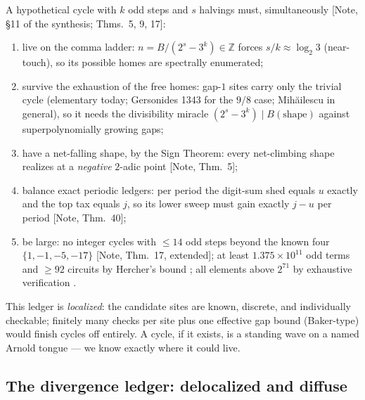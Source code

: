 \documentclass[11pt]{article}
\theoremstyle{definition}
\theoremstyle{remark}
\newcommand{\anchor}[1]{\textup{[#1]}}
\newcommand{\Z}{\mathbb{Z}}
\begin{document}
A hypothetical cycle with $k$ odd steps and $s$ halvings must, simultaneously
\anchor{Note, \S11 of the synthesis; Thms.~5, 9, 17}:
\begin{enumerate}[leftmargin=2em, itemsep=1pt]
\item live on the comma ladder: $n = B/(2^s-3^k) \in \Z$ forces
$s/k \approx \log_2 3$ (near-touch), so its possible homes are spectrally
enumerated;
\item survive the exhaustion of the free homes: gap-$1$ sites carry only the
trivial cycle (elementary today; Gersonides 1343 for the $9/8$ case;
Mih\u{a}ilescu in general), so it needs the divisibility miracle
$(2^s-3^k) \mid B(\text{shape})$ against superpolynomially growing gaps;
\item have a net-falling shape, by the Sign Theorem: every net-climbing shape
realizes at a \emph{negative} $2$-adic point \anchor{Note, Thm.~5};
\item balance exact periodic ledgers: per period the digit-sum shed equals
$u$ exactly and the top tax equals $j$, so its lower sweep must gain exactly
$j-u$ per period \anchor{Note, Thm.~40};
\item be large: no integer cycles with $\leq 14$ odd steps beyond the known
four $\{1, -1, -5, -17\}$ \anchor{Note, Thm.~17, extended}; at least
$1.375 \times 10^{11}$ odd terms and $\geq 92$ circuits by Hercher's bound
\cite{Hercher2023}; all elements above $2^{71}$ by exhaustive verification
\cite{Barina2021}.
\end{enumerate}
This ledger is \emph{localized}: the candidate sites are known, discrete,
and individually checkable; finitely many checks per site plus one effective
gap bound (Baker-type) would finish cycles off entirely. A cycle, if it
exists, is a standing wave on a named Arnold tongue --- we know exactly where
it could live.

\subsection{The divergence ledger: delocalized and diffuse}
\end{document}
